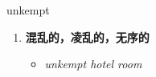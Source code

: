 
\begin{frame}
{\huge unkempt}
\begin{center}
\begin{enumerate}\Large
  \item \textbf{混乱的，凌乱的，无序的}
  \begin{itemize}
    \item \em{\Large{unkempt hotel room}}
  \end{itemize}
\end{enumerate}
\end{center}
\end{frame}
